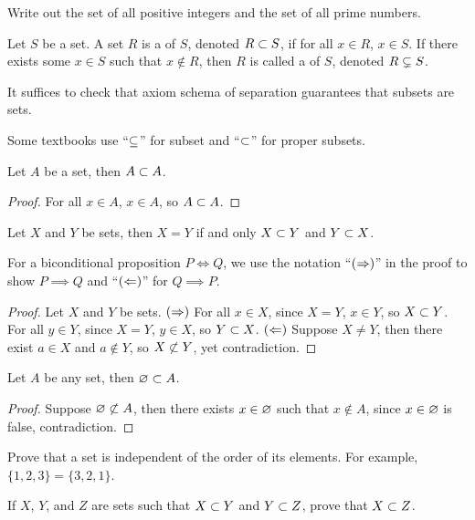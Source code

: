 \documentclass[10pt]{article}
\begin{document}
\begin{problem}
    Write out the set of all positive integers and the set of all prime numbers.
\end{problem}
\begin{definition}
    Let $S$ be a set. A set $R$ is a  of $S$, denoted $R\subset S$, if for all $x\in R$, $x\in S$. If there exists some $x\in S$ such that $x\notin R$, then $R$ is called a  of $S$, denoted $R\subsetneq S$.
\end{definition}
\par
It suffices to check that axiom schema of separation guarantees that subsets are sets.
\begin{remark}
    Some textbooks use ``$\subseteq$'' for subset and ``$\subset$'' for proper subsets.
\end{remark}
\begin{proposition}
    Let $A$ be a set, then $A\subset A$.
\end{proposition}
\begin{proof}
    For all $x\in A$, $x\in A$, so $A\subset A$. 
\end{proof}
\begin{proposition}
    Let $X$ and $Y$ be sets, then $X=Y$ if and only $X\subset Y$ and $Y\subset X$.
\end{proposition}
\begin{remark}
    For a biconditional proposition $P\iff Q$, we use the notation ``$(\Rightarrow)$'' in the proof to show $P\implies Q$ and ``$(\Leftarrow)$'' for $Q\implies P$.
\end{remark}
\begin{proof}
    Let $X$ and $Y$ be sets. $(\Rightarrow)$ For all $x\in X$, since $X=Y$, $x\in Y$, so $X\subset Y$. For all $y\in Y$, since $X=Y$, $y\in X$, so $Y\subset X$. $(\Leftarrow)$ Suppose $X\ne Y$, then there exist $a\in X$ and $a\notin Y$, so $X\nsub Y$, yet contradiction. 
\end{proof}
\begin{proposition}
    Let $A$ be any set, then $\varnothing\subset A$.
\end{proposition}
\begin{proof}
    Suppose $\es\nsub A$, then there exists $x\in\varnothing$ such that $x\notin A$, since $x\in\varnothing$ is false, contradiction.
\end{proof}
\begin{problem}
    Prove that a set is independent of the order of its elements. For example, $\{1,2,3\}=\{3,2,1\}$.
\end{problem}
\begin{problem}
    If $X$, $Y$, and $Z$ are sets such that $X\subset Y$ and $Y\subset Z$, prove that $X\subset Z$.
\end{problem}
\end{document}
